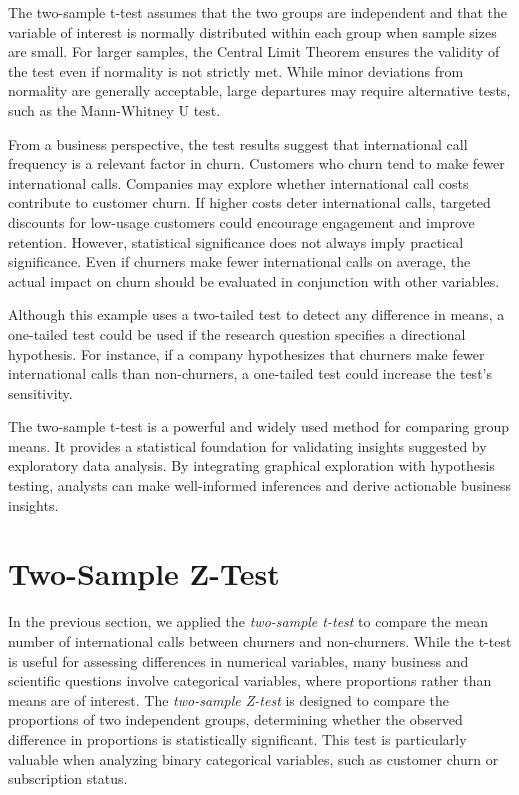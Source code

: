 \documentclass[
  11pt,
]{book}
\theoremstyle{definition}
\theoremstyle{definition}
\theoremstyle{definition}
\theoremstyle{definition}
\theoremstyle{remark}
\begin{document}
The two-sample t-test assumes that the two groups are independent and that the variable of interest is normally distributed within each group when sample sizes are small. For larger samples, the Central Limit Theorem ensures the validity of the test even if normality is not strictly met. While minor deviations from normality are generally acceptable, large departures may require alternative tests, such as the Mann-Whitney U test.

From a business perspective, the test results suggest that international call frequency is a relevant factor in churn. Customers who churn tend to make fewer international calls. Companies may explore whether international call costs contribute to customer churn. If higher costs deter international calls, targeted discounts for low-usage customers could encourage engagement and improve retention. However, statistical significance does not always imply practical significance. Even if churners make fewer international calls on average, the actual impact on churn should be evaluated in conjunction with other variables.

Although this example uses a two-tailed test to detect any difference in means, a one-tailed test could be used if the research question specifies a directional hypothesis. For instance, if a company hypothesizes that churners make fewer international calls than non-churners, a one-tailed test could increase the test's sensitivity.

The two-sample t-test is a powerful and widely used method for comparing group means. It provides a statistical foundation for validating insights suggested by exploratory data analysis. By integrating graphical exploration with hypothesis testing, analysts can make well-informed inferences and derive actionable business insights.

\section{Two-Sample Z-Test}\label{two-sample-z-test}

In the previous section, we applied the \emph{two-sample t-test} to compare the mean number of international calls between churners and non-churners. While the t-test is useful for assessing differences in numerical variables, many business and scientific questions involve categorical variables, where proportions rather than means are of interest. The \emph{two-sample Z-test} is designed to compare the proportions of two independent groups, determining whether the observed difference in proportions is statistically significant. This test is particularly valuable when analyzing binary categorical variables, such as customer churn or subscription status.
\end{document}
